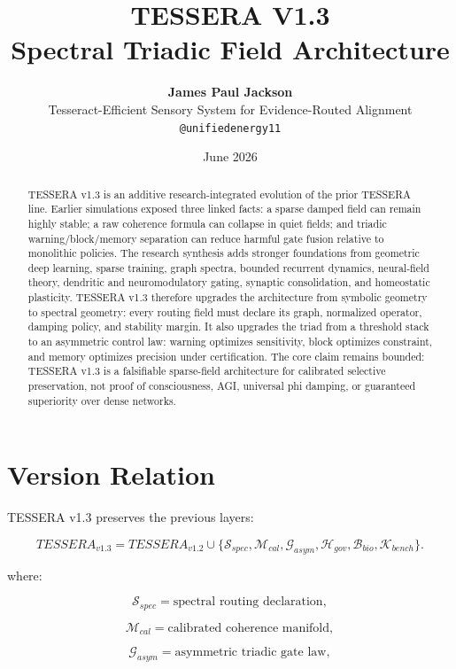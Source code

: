 \documentclass[12pt]{article}
\title{\textbf{TESSERA V1.3}\\
\large Spectral Triadic Field Architecture}
\author{\textbf{James Paul Jackson}\\[4pt]
\small Tesseract-Efficient Sensory System for Evidence-Routed Alignment\\
\small \texttt{@unifiedenergy11}}
\date{June 2026}
\begin{document}
\maketitle

\begin{abstract}
TESSERA v1.3 is an additive research-integrated evolution of the prior TESSERA
line. Earlier simulations exposed three linked facts: a sparse damped field can
remain highly stable; a raw coherence formula can collapse in quiet fields; and
triadic warning/block/memory separation can reduce harmful gate fusion relative
to monolithic policies. The research synthesis adds stronger foundations from
geometric deep learning, sparse training, graph spectra, bounded recurrent
dynamics, neural-field theory, dendritic and neuromodulatory gating, synaptic
consolidation, and homeostatic plasticity. TESSERA v1.3 therefore upgrades the
architecture from symbolic geometry to spectral geometry: every routing field
must declare its graph, normalized operator, damping policy, and stability
margin. It also upgrades the triad from a threshold stack to an asymmetric
control law: warning optimizes sensitivity, block optimizes constraint, and
memory optimizes precision under certification. The core claim remains bounded:
TESSERA v1.3 is a falsifiable sparse-field architecture for calibrated
selective preservation, not proof of consciousness, AGI, universal phi damping,
or guaranteed superiority over dense networks.
\end{abstract}

\section{Version Relation}

TESSERA v1.3 preserves the previous layers:

\[
TESSERA_{v1.3}
=
TESSERA_{v1.2}
\cup
\{
\mathcal{S}_{spec},
\mathcal{M}_{cal},
\mathcal{G}_{asym},
\mathcal{H}_{gov},
\mathcal{B}_{bio},
\mathcal{K}_{bench}
\}.
\]

where:

\[
\mathcal{S}_{spec}=\text{spectral routing declaration},
\]

\[
\mathcal{M}_{cal}=\text{calibrated coherence manifold},
\]

\[
\mathcal{G}_{asym}=\text{asymmetric triadic gate law},
\]
\end{document}
